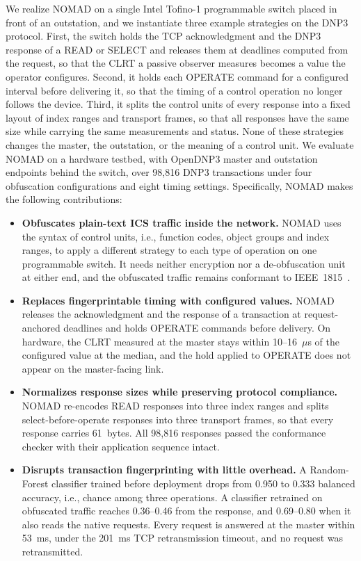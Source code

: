 We realize NOMAD on a single Intel Tofino-1 programmable switch placed in front of an outstation, and we instantiate three example strategies on the DNP3 protocol. First, the switch holds the TCP acknowledgment and the DNP3 response of a READ or SELECT and releases them at deadlines computed from the request, so that the CLRT a passive observer measures becomes a value the operator configures. Second, it holds each OPERATE command for a configured interval before delivering it, so that the timing of a control operation no longer follows the device. Third, it splits the control units of every response into a fixed layout of index ranges and transport frames, so that all responses have the same size while carrying the same measurements and status. None of these strategies changes the master, the outstation, or the meaning of a control unit. We evaluate NOMAD on a hardware testbed, with OpenDNP3 master and outstation endpoints behind the switch, over 98,816 DNP3 transactions under four obfuscation configurations and eight timing settings. Specifically, NOMAD makes the following contributions:

\begin{itemize}[leftmargin=*,labelindent=0pt,topsep=2pt,itemsep=2pt,parsep=0pt]
\item \textbf{Obfuscates plain-text ICS traffic inside the network.} NOMAD uses the syntax of control units, i.e., function codes, object groups and index ranges, to apply a different strategy to each type of operation on one programmable switch. It needs neither encryption nor a de-obfuscation unit at either end, and the obfuscated traffic remains conformant to IEEE~1815~\cite{dnp3std}.
\item \textbf{Replaces fingerprintable timing with configured values.} NOMAD releases the acknowledgment and the response of a transaction at request-anchored deadlines and holds OPERATE commands before delivery. On hardware, the CLRT measured at the master stays within 10--16~$\mu$s of the configured value at the median, and the hold applied to OPERATE does not appear on the master-facing link.
\item \textbf{Normalizes response sizes while preserving protocol compliance.} NOMAD re-encodes READ responses into three index ranges and splits select-before-operate responses into three transport frames, so that every response carries 61~bytes. All 98,816 responses passed the conformance checker with their application sequence intact.
\item \textbf{Disrupts transaction fingerprinting with little overhead.} A Random-Forest classifier trained before deployment drops from 0.950 to 0.333 balanced accuracy, i.e., chance among three operations. A classifier retrained on obfuscated traffic reaches 0.36--0.46 from the response, and 0.69--0.80 when it also reads the native requests. Every request is answered at the master within 53~ms, under the 201~ms TCP retransmission timeout, and no request was retransmitted.
\end{itemize}
